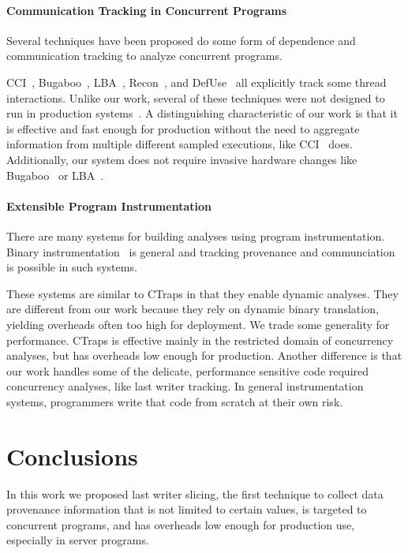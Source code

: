 \documentclass[preprint,9pt]{sigplanconf}
\newcommand{\ctraps}{CTraps\xspace}
\begin{document}
\paragraph{Communication Tracking in Concurrent Programs}
Several techniques have been proposed do some form of dependence and
communication tracking to analyze concurrent programs.  

CCI~\cite{cci}, Bugaboo~\cite{bugaboo}, LBA~\cite{paralog}, Recon~\cite{recon},
and DefUse~\cite{defuse} all explicitly track some thread interactions.  Unlike
our work, several of these techniques were not designed to run in production
systems~\cite{recon,defuse}.  A distinguishing characteristic of our work is
that it is effective and fast enough for production without the need to
aggregate information from multiple different sampled executions, like
CCI~\cite{cci} does.  Additionally, our system does not require invasive
hardware changes like Bugaboo~\cite{bugaboo} or LBA~\cite{paralog}.

\paragraph{Extensible Program Instrumentation} 
There are many systems for building analyses using program instrumentation.
Binary instrumentation~\cite{pin,dynamorio,valgrind,roadrunner} is general and
tracking provenance and communciation is possible in such systems.  

These systems are similar to \ctraps in that they enable dynamic analyses.
They are different from our work because they rely on dynamic binary
translation, yielding overheads often too high for deployment.  We trade some
generality for performance. \ctraps is effective mainly in the restricted
domain of concurrency analyses, but has overheads low enough for production.
Another difference is that our work handles some of the delicate, performance
sensitive code required concurrency analyses, like last writer tracking.  In
general instrumentation systems, programmers write that code from scratch at
their own risk.  

\section{Conclusions}
In this work we proposed last writer slicing, the first technique to collect data provenance information
that is not limited to certain values, is targeted to concurrent programs, and
has overheads low enough for production use, especially in server programs. 
\end{document}
